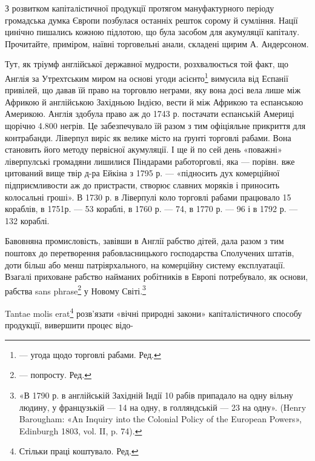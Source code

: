 З розвитком капіталістичної продукції протягом мануфактурного
періоду громадська думка Європи позбулася останніх решток
сорому й сумління. Нації цинічно пишались кожною підлотою,
що була засобом для акумуляції капіталу. Прочитайте, приміром,
наївні торговельні анали, складені щирим А. Андерсоном.

Тут, як тріумф англійської державної мудрости, розхвалюється
той факт, що Англія за Утрехтським миром на основі
угоди асієнто\footnote*{
— угода щодо торговлі рабами. Ред.
} вимусила від Еспанії привілей, що давав їй
право на торговлю неграми, яку вона досі вела лише між Африкою
й англійською Західньою Індією, вести й між Африкою та
еспанською Америкою. Англія здобула право аж до 1743 р. постачати
еспанській Америці щорічно 4.800 негрів. Це забезпечувало
їй разом з тим офіціяльне прикриття для контрабанди.
Ліверпул виріс як велике місто на ґрунті торговлі рабами.
Вона становить його методу первісної акумуляції. І ще й по сей
день «поважні» ліверпулські громадяни лишилися Піндарами
работорговлі, яка — порівн. вже цитований вище твір д-ра Ейкіна
з 1795 р. — «підносить дух комерційної підприємливости аж до
пристрасти, створює славних моряків і приносить колосальні
гроші». В 1730 р. в Ліверпулі коло торговлі рабами працювало
15 кораблів, в 1751р. — 53 кораблі, в 1760 р. — 74, в 1770 р. —
96 і в 1792 р. — 132 кораблі.

Бавовняна промисловість, завівши в Англії рабство дітей,
дала разом з тим поштовх до перетворення рабовласницького
господарства Сполучених штатів, доти більш або менш патріярхального,
на комерційну систему експлуатації. Взагалі приховане
рабство найманих робітників в Европі потребувало, як основи,
рабства sans phrase\footnote*{
— попросту. Ред.
} у Новому Світі.\footnote{
«В 1790 р. в англійській Західній Індії 10 рабів припадало на
одну вільну людину, у французькій — 14 на одну, в голляндській — 23
на одну». (Henry Barougham: «An Inquiry into the Colonial Policy of
the European Powers», Edinburgh 1803, vol. II, p. 74).
}

Tantae molis erat\footnote*{
Стільки праці коштувало. Ред.
} розв’язати «вічні природні закони»
капіталістичного способу продукції, вивершити процес відо-

